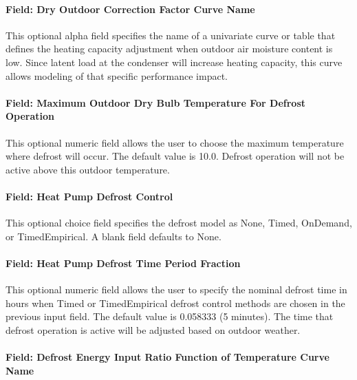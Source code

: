 \paragraph{Field: Dry Outdoor Correction Factor Curve Name}\label{plhp_eir_heating_inputs_dry_outdoor_correction_factor_curve_name}

This optional alpha field specifies the name of a univariate curve or table that defines the heating capacity adjustment when outdoor air moisture content is low. Since latent load at the condenser will increase heating capacity, this curve allows modeling of that specific performance impact.

\paragraph{Field: Maximum Outdoor Dry Bulb Temperature For Defrost Operation}\label{plhp_eir_heating_inputs_max_oat_for_defrost_operation}

This optional numeric field allows the user to choose the maximum temperature where defrost will occur. The default value is 10.0. Defrost operation will not be active above this outdoor temperature.

\paragraph{Field: Heat Pump Defrost Control}\label{plhp_eir_heating_inputs_heat_pump_defrost_control}

This optional choice field specifies the defrost model as None, Timed, OnDemand, or TimedEmpirical. A blank field defaults to None.

\paragraph{Field: Heat Pump Defrost Time Period Fraction}\label{plhp_eir_heating_inputs_heat_pump_defrost_time_period_fraction}

This optional numeric field allows the user to specify the nominal defrost time in hours when Timed or TimedEmpirical defrost control methods are chosen in the previous input field. The default value is 0.058333 (5 minutes). The time that defrost operation is active will be adjusted based on outdoor weather.

\paragraph{Field: Defrost Energy Input Ratio Function of Temperature Curve Name}\label{plhp_eir_heating_inputs_defrost_eir_function_temp_curve_name}

